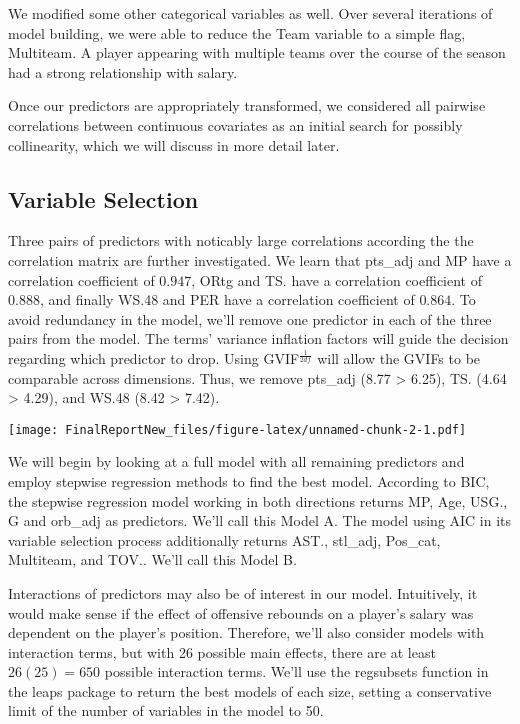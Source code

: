 \documentclass[]{article}
\begin{document}
We modified some other categorical variables as well. Over several
iterations of model building, we were able to reduce the Team variable
to a simple flag, Multiteam. A player appearing with multiple teams over
the course of the season had a strong relationship with salary.

Once our predictors are appropriately transformed, we considered all
pairwise correlations between continuous covariates as an initial search
for possibly collinearity, which we will discuss in more detail later.

\subsection{Variable Selection}\label{variable-selection}

Three pairs of predictors with noticably large correlations according
the the correlation matrix are further investigated. We learn that
pts\_adj and MP have a correlation coefficient of \(0.947\), ORtg and
TS. have a correlation coefficient of \(0.888\), and finally WS.48 and
PER have a correlation coefficient of \(0.864\). To avoid redundancy in
the model, we'll remove one predictor in each of the three pairs from
the model. The terms' variance inflation factors will guide the decision
regarding which predictor to drop. Using GVIF\(^\frac{1}{2df}\) will
allow the GVIFs to be comparable across dimensions. Thus, we remove
pts\_adj (8.77 \textgreater{} 6.25), TS. (4.64 \textgreater{} 4.29), and
WS.48 (8.42 \textgreater{} 7.42).

\texttt{[image: FinalReportNew\_files/figure-latex/unnamed-chunk-2-1.pdf]}

We will begin by looking at a full model with all remaining predictors
and employ stepwise regression methods to find the best model. According
to BIC, the stepwise regression model working in both directions returns
MP, Age, USG., G and orb\_adj as predictors. We'll call this Model A.
The model using AIC in its variable selection process additionally
returns AST., stl\_adj, Pos\_cat, Multiteam, and TOV.. We'll call this
Model B.

Interactions of predictors may also be of interest in our model.
Intuitively, it would make sense if the effect of offensive rebounds on
a player's salary was dependent on the player's position. Therefore,
we'll also consider models with interaction terms, but with 26 possible
main effects, there are at least \(26(25)=650\) possible interaction
terms. We'll use the regsubsets function in the leaps package to return
the best models of each size, setting a conservative limit of the number
of variables in the model to 50.
\end{document}
